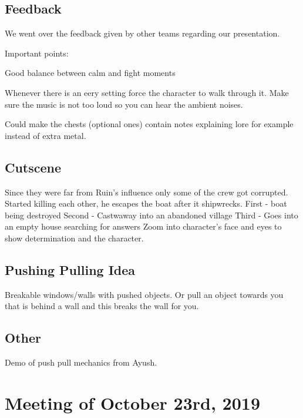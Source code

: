 \documentclass{article}
\begin{document}
\subsection{Feedback}
We went over the feedback given by other teams regarding our presentation.

Important points:
\begin{description}
\item Good balance between calm and fight moments
\item Whenever there is an eery setting force the character to walk through it. Make sure the music is not too loud so you can hear the ambient noises.
\item Could make the chests (optional ones) contain notes explaining lore for example instead of extra metal.
\end{description}

\subsection{Cutscene}
Since they were far from Ruin's influence only some of the crew got corrupted. Started killing each other, he escapes the boat after it shipwrecks. 
First - boat being destroyed
Second - Castwaway into an abandoned village
Third - Goes into an empty house searching for answers
Zoom into character's face and eyes to show determination and the character.

\subsection{Pushing Pulling Idea}
Breakable windows/walls with pushed objects. Or pull an object towards you that is behind a wall and this breaks the wall for you.

\subsection{Other}
Demo of push pull mechanics from Ayush.










\section{Meeting of October 23rd, 2019}
\end{document}
